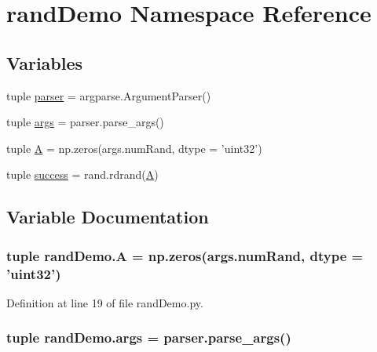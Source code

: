 \hypertarget{namespacerand_demo}{\section{rand\-Demo Namespace Reference}
\label{namespacerand_demo}
}
\subsection*{Variables}
\begin{DoxyCompactItemize}
\item 
tuple \hyperlink{namespacerand_demo_aefb5f3796ae10e974d19b3df08a8268b}{parser} = argparse.\-Argument\-Parser()
\item 
tuple \hyperlink{namespacerand_demo_a8fff5e177582984d2e62972f20ae502c}{args} = parser.\-parse\-\_\-args()
\item 
tuple \hyperlink{namespacerand_demo_a473eba4c6c70e86ff3527361c634c491}{A} = np.\-zeros(args.\-num\-Rand, dtype = 'uint32')
\item 
tuple \hyperlink{namespacerand_demo_a7b35ea6a4b4b19e13476f6e085556b7e}{success} = rand.\-rdrand(\hyperlink{namespacerand_demo_a473eba4c6c70e86ff3527361c634c491}{A})
\end{DoxyCompactItemize}


\subsection{Variable Documentation}
\hypertarget{namespacerand_demo_a473eba4c6c70e86ff3527361c634c491}{
\subsubsection[{A}]{\setlength{\rightskip}{0pt plus 5cm}tuple rand\-Demo.\-A = np.\-zeros(args.\-num\-Rand, dtype = 'uint32')}}\label{namespacerand_demo_a473eba4c6c70e86ff3527361c634c491}


Definition at line 19 of file rand\-Demo.\-py.

\hypertarget{namespacerand_demo_a8fff5e177582984d2e62972f20ae502c}{
\subsubsection[{args}]{\setlength{\rightskip}{0pt plus 5cm}tuple rand\-Demo.\-args = parser.\-parse\-\_\-args()}}\label{namespacerand_demo_a8fff5e177582984d2e62972f20ae502c}


